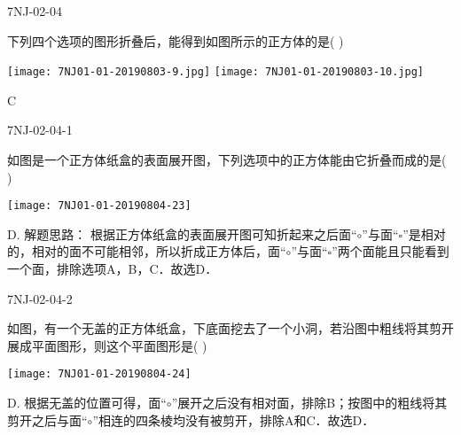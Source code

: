 \begin{defproblem}{7NJ-02-04}%
\begin{onlyproblem}%
下列四个选项的图形折叠后，能得到如图所示的正方体的是(    ) 
\begin{center}
\texttt{[image: 7NJ01-01-20190803-9.jpg]}
\texttt{[image: 7NJ01-01-20190803-10.jpg]}
\end{center}


\end{onlyproblem}%
\begin{onlysolution}%
\begin{solution}%
C
\end{solution}%
\end{onlysolution}%
\end{defproblem}



\begin{defproblem}{7NJ-02-04-1}%
\begin{onlyproblem}%
如图是一个正方体纸盒的表面展开图，下列选项中的正方体能由它折叠而成的是(    ) 
\begin{center}
\texttt{[image: 7NJ01-01-20190804-23]}
\end{center}


\end{onlyproblem}%
\begin{onlysolution}%
\begin{solution}%
D. 
解题思路： 根据正方体纸盒的表面展开图可知折起来之后面“$\circ$”与面“$\square$”是相对的，相对的面不可能相邻，所以折成正方体后，面“$\circ$”与面“$\square$”两个面能且只能看到一个面，排除选项A，B，C．故选D． 

\end{solution}%
\end{onlysolution}%
\end{defproblem}




\begin{defproblem}{7NJ-02-04-2}%
\begin{onlyproblem}%
如图，有一个无盖的正方体纸盒，下底面挖去了一个小洞，若沿图中粗线将其剪开展成平面图形，则这个平面图形是(    ) 
\begin{center}
\texttt{[image: 7NJ01-01-20190804-24]}
\end{center}


\end{onlyproblem}%
\begin{onlysolution}%
\begin{solution}%
D. 根据无盖的位置可得，面“$\circ$”展开之后没有相对面，排除B；按图中的粗线将其剪开之后与面“$\circ$”相连的四条棱均没有被剪开，排除A和C．故选D． 
\end{solution}%
\end{onlysolution}%
\end{defproblem}



